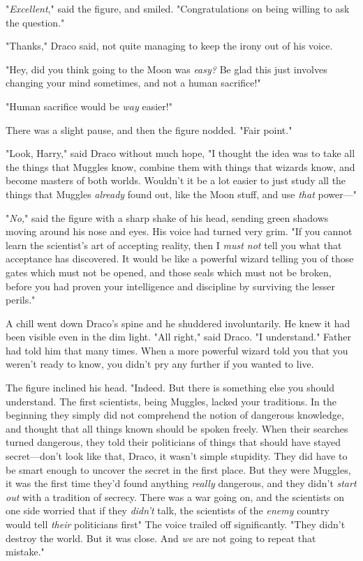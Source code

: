 "\emph{Excellent}," said the figure, and smiled. "Congratulations on being
willing to ask the question."

"Thanks," Draco said, not quite managing to keep the irony out of his voice.

"Hey, did you think going to the Moon was \emph{easy?} Be glad this just
involves changing your mind sometimes, and not a human sacrifice!"

"Human sacrifice would be \emph{way} easier!"

There was a slight pause, and then the figure nodded. "Fair point."

"Look, Harry," said Draco without much hope, "I thought the idea was to take
all the things that Muggles know, combine them with things that wizards know,
and become masters of both worlds. Wouldn't it be a lot easier to just study
all the things that Muggles \emph{already} found out, like the Moon stuff, and
use \emph{that} power—"

"\emph{No,}" said the figure with a sharp shake of his head, sending green
shadows moving around his nose and eyes. His voice had turned very grim. "If
you cannot learn the scientist's art of accepting reality, then I \emph{must
not} tell you what that acceptance has discovered. It would be like a powerful
wizard telling you of those gates which must not be opened, and those seals
which must not be broken, before you had proven your intelligence and
discipline by surviving the lesser perils."

A chill went down Draco's spine and he shuddered involuntarily. He knew it had
been visible even in the dim light. "All right," said Draco. "I understand."
Father had told him that many times. When a more powerful wizard told you that
you weren't ready to know, you didn't pry any further if you wanted to live.

The figure inclined his head. "Indeed. But there is something else you should
understand. The first scientists, being Muggles, lacked your traditions. In the
beginning they simply did not comprehend the notion of dangerous knowledge, and
thought that all things known should be spoken freely. When their searches
turned dangerous, they told their politicians of things that should have stayed
secret—don't look like that, Draco, it wasn't simple stupidity. They did have
to be smart enough to uncover the secret in the first place. But they were
Muggles, it was the first time they'd found anything \emph{really} dangerous,
and they didn't \emph{start out} with a tradition of secrecy. There was a war
going on, and the scientists on one side worried that if they \emph{didn't}
talk, the scientists of the \emph{enemy} country would tell \emph{their}
politicians first{\el}" The voice trailed off significantly. "They didn't
destroy the world. But it was close. And \emph{we} are not going to repeat that
mistake."

